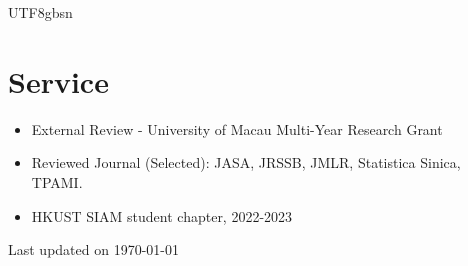 \documentclass[a4paper,10pt]{article}
\begin{document}
\begin{CJK*}{UTF8}{gbsn}


\vspace{5pt}
\section{Service}
\begin{itemize}[leftmargin=*]
  \item External Review - University of Macau Multi-Year Research Grant
  \item Reviewed Journal (Selected): JASA, JRSSB, JMLR, Statistica Sinica, TPAMI. 
  \item {HKUST SIAM student chapter, 2022-2023}
\end{itemize}



%

\par\vfill\hfill{\scriptsize\color{gray}Last updated on \today}
\end{CJK*}
\end{document}
